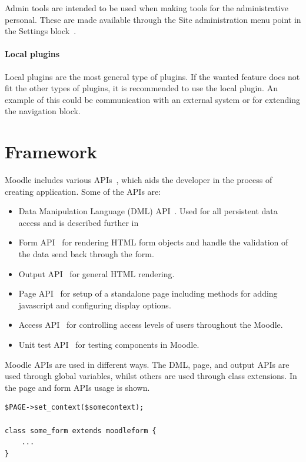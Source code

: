 Admin tools are intended to be used when making tools for the administrative personal.
These are made available through the Site administration menu point in the Settings block~\cite{moodleadmintools}.

\paragraph{Local plugins}
Local plugins are the most general type of plugins. If the wanted feature does not fit the other types of plugins, it is recommended to use the local plugin. An example of this could be communication with an external system or for extending the navigation block. 




\section{Framework}
Moodle includes various APIs~\cite{moodlecoreapis}, which aids the developer in the process of creating application. Some of the APIs are:

\begin{itemize}
	\item Data Manipulation Language (DML) API~\cite{moodledml}.
	Used for all persistent data access and is described further in 
	\item Form API~\cite{moodleformapi} for rendering HTML form objects and handle the validation of the data send back through the form. 
	\item Output API~\cite{moodleoutputapi} for general HTML rendering.
	\item Page API~\cite{moodlepageapi} for setup of a standalone page including methods for adding javascript and configuring display options. 
	\item Access API~\cite{moodleaccessapi} for controlling access levels of users throughout the Moodle. 
	\item Unit test API~\cite{moodleunittestapi} for testing components in Moodle. 
\end{itemize}
Moodle APIs are used in different ways. The DML, page, and output APIs are used through global variables, whilst others are used through class extensions. In~ the page and form APIs usage is shown.
\begin{lstlisting}[style=phpCode, caption=\myCaption{Example of the Page and form APIs in Moodle}, label=moodleapiusage]
$PAGE->set_context($somecontext);

class some_form extends moodleform {
	...
}
\end{lstlisting}


